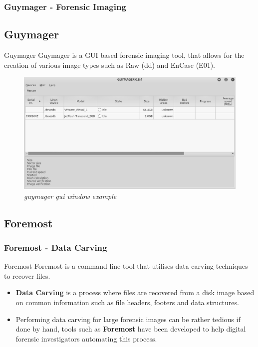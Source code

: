 \documentclass{beamer}
\begin{document}
\begin{frame}
	\frametitle{Guymager - Forensic Imaging}
	\subsection*{Guymager}
	\begin{block}{Guymager}
		Guymager is a GUI based forensic imaging tool, that allows for the creation of various image types such as Raw (dd) and EnCase (E01).
	\end{block}
	\begin{figure}[h]
		\centering
		\includegraphics[scale=0.3]{guymager-window}
		\caption{\textit{guymager gui window example}}
		\label{fig:guymager-main-window}
	\end{figure}
\end{frame}

\begin{frame}
	\subsection*{Foremost}
	\frametitle{Foremost - Data Carving}
	\begin{block}{Foremost}
		Foremost is a command line tool that utilises data carving techniques to recover files.
	\end{block}
	\begin{itemize}
		\item \textbf{Data Carving} is a process where files are recovered from a disk image based on common information such as file headers, footers and data structures. 
		\item Performing data carving for large forensic images can be rather tedious if done by hand, tools such as \textbf{Foremost} have been developed to help digital forensic investigators automating this process.
	\end{itemize}
\end{frame}
\end{document}
